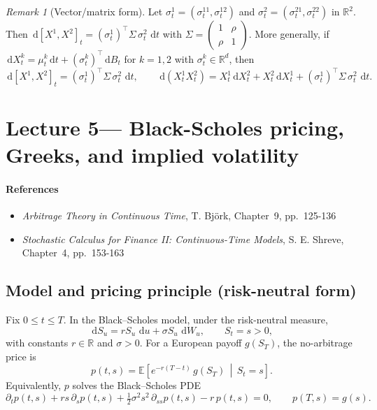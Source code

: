 \documentclass[11pt]{article}
\newcommand{\R}{\mathbb{R}}
\newcommand{\E}{\mathbb{E}}
\newcommand{\dd}{\,\mathrm{d}}
\newcommand{\1}{\mathbf{1}}
\theoremstyle{plain}
\theoremstyle{definition}
\theoremstyle{remark}
\newtheorem{remark}[theorem]{Remark}
\begin{document}
\begin{remark}[Vector/matrix form]
Let $\sigma_t^1=(\sigma_t^{11},\sigma_t^{12})$ and $\sigma_t^2=(\sigma_t^{21},\sigma_t^{22})$ in $\R^2$.
Then $\dd[X^1,X^2]_t = (\sigma_t^1)^\top \Sigma\,\sigma_t^2\,\dd t$ with
$\Sigma=\begin{pmatrix}1&\rho\\ \rho&1\end{pmatrix}$.
More generally, if $\dd X_t^k=\mu_t^k\dd t + (\sigma_t^k)^\top \dd B_t$ for $k=1,2$ with $\sigma_t^k\in\R^d$, then
\[
\dd[X^1,X^2]_t = (\sigma_t^1)^\top \Sigma\,\sigma_t^2\,\dd t,
\qquad
\dd(X_t^1X_t^2)=X_t^1\dd X_t^2+X_t^2\dd X_t^1+(\sigma_t^1)^\top \Sigma\,\sigma_t^2\,\dd t.
\]
\end{remark}


\section{Lecture 5--- Black-Scholes pricing, Greeks, and implied volatility}

\paragraph{References}

\begin{itemize}[leftmargin=1.4em]

\item \textit{Arbitrage Theory in Continuous Time},  
T. Björk, Chapter~9, pp.~125-136

\item \textit{Stochastic Calculus for Finance II: Continuous-Time Models},  
S. E. Shreve, Chapter~4, pp.~153-163

\end{itemize}


\subsection{Model and pricing principle (risk-neutral form)}
Fix $0\le t\le T$. In the Black--Scholes model, under the risk-neutral measure,
\[
\dd S_u = r S_u\,\dd u + \sigma S_u\,\dd W_u,
\qquad S_t=s>0,
\]
with constants $r\in\R$ and $\sigma>0$. For a European payoff $g(S_T)$, the no-arbitrage price is
\[
p(t,s)=\E\!\left[e^{-r(T-t)}\,g(S_T)\,\middle|\,S_t=s\right].
\]
Equivalently, $p$ solves the Black--Scholes PDE
\begin{equation}\label{eq:BS-PDE}
\partial_t p(t,s)+r s\,\partial_s p(t,s)+\tfrac12\sigma^2 s^2\,\partial_{ss}p(t,s)-r\,p(t,s)=0,
\qquad p(T,s)=g(s).
\end{equation}
\end{document}
